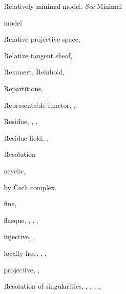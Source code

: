 {{\noindent\hspace*{0.0bp}Relatively minimal model. \emph{See} Minimal\par
\noindent\hspace*{15.0bp}model\par
\noindent\hspace*{0.0bp}Relative projective space, \par
\noindent\hspace*{0.0bp}Relative tangent sheaf, \par
\noindent\hspace*{0.0bp}Remmert, Reinhold, \par
\noindent\hspace*{0.0bp}Repartitions, \par
\noindent\hspace*{0.0bp}Representable functor, , \par
\noindent\hspace*{0.0bp}Residue, , , \par
\noindent\hspace*{0.0bp}Residue field, , \par
\noindent\hspace*{0.0bp}Resolution\par
\noindent\hspace*{7.5bp}acyclic, \par
\noindent\hspace*{7.5bp}by \v{C}ech complex, \par
\noindent\hspace*{7.5bp}fine, \par
\noindent\hspace*{7.5bp}flasque, , , , \par
\noindent\hspace*{7.5bp}injective, , \par
\noindent\hspace*{7.5bp}locally free, , , \par
\noindent\hspace*{7.5bp}projective, , \par
\noindent\hspace*{0.0bp}Resolution of singularities, , , , ,\par
}}
